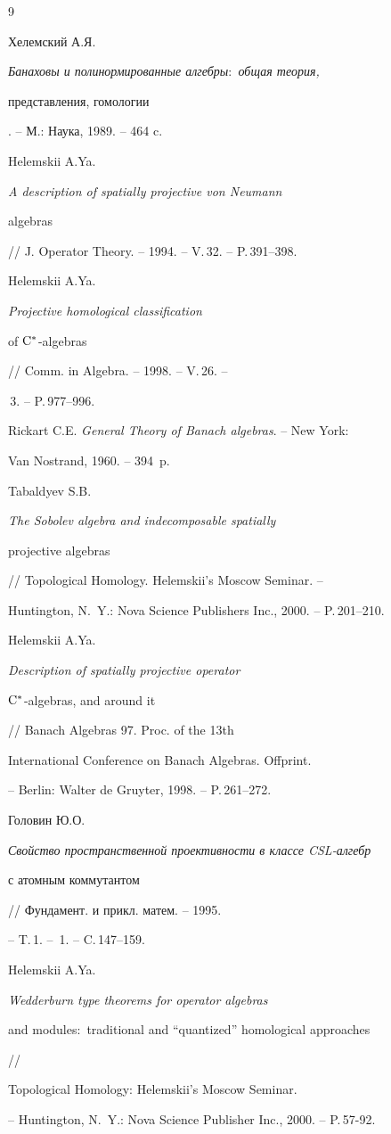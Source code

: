 \begin{thebibliography}{9}







Хелемский А.Я. {\em Банаховы и полинормированные алгебры\/$:$ общая теория,


представления, гомологии}. -- М.: Наука, 1989. --  464 c.




Helemskii A.Ya. {\em A description of spatially projective von Neumann 


algebras} // J. Operator Theory. -- 1994. -- V.\,32. -- P.\,391--398.




Helemskii A.Ya. {\em Projective homological classification 


of $\mathrm C^*$-algebras} // Comm. in Algebra. -- 1998. -- V.\,26. -- 


\No\,3. -- P.\,977--996.




Rickart C.E. {\em General Theory of Banach algebras}. -- New York:


Van Nostrand, 1960. -- 394~p.




Tabaldyev S.B. {\em The Sobolev algebra and indecomposable spatially


projective algebras} // Topological Homology. Helemskii's Moscow Seminar. -- 


Huntington, N.~Y.: Nova Science Publishers Inc., 2000. -- P.\,201--210.




Helemskii A.Ya. {\em Description of spatially projective operator


$\mathrm C^*$-algebras, and around it} // Banach Algebras 97. Proc. of the 13th


International Conference on Banach Algebras. Offprint.


-- Berlin: Walter de Gruyter, 1998. -- P.\,261--272. 




Головин Ю.О. {\em Свойство пространственной проективности в классе CSL-алгебр


с атомным коммутантом} // Фундамент. и прикл. матем. -- 1995.


-- T.\,1. -- \No\,1. -- C.\,147--159.




Helemskii A.Ya. {\em Wedderburn type theorems for operator algebras


and modules\/$:$ traditional and ``quantized'' homological approaches} //


Topological Homology: Helemskii's Moscow Seminar.


-- Huntington, N.~Y.: Nova Science Publisher Inc., 2000. -- P.\,57-92.





\end{thebibliography}





